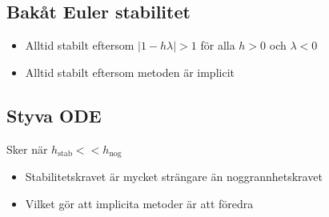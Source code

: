 \documentclass[a4paper,11pt]{article}
\begin{document}
\subsection{Bakåt Euler stabilitet}
\begin{itemize}
    \item Alltid stabilt eftersom $|1 - h \lambda| > 1$ för alla $h > 0$ och $\lambda < 0$
    \item Alltid stabilt eftersom metoden är implicit
\end{itemize}

\subsection{Styva ODE}
Sker när $h_{\text{stab}} << h_{\text{nog}}$
\begin{itemize}
    \item Stabilitetskravet är mycket strängare än noggrannhetskravet
    \item Vilket gör att implicita metoder är att föredra
\end{itemize}
\end{document}
